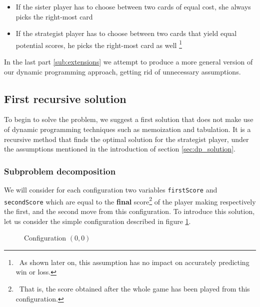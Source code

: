 \documentclass[a4paper,12pt,fleqn]{article}
\newcommand\ezskip{\medskip\noindent}
\begin{document}
\begin{itemize}
    \item If the sister player has to choose between two cards of equal cost, she always picks the right-most card
    \item If the strategist player has to choose between two cards that yield equal potential scores, he picks the right-most card as well \footnote{\ As shown later on, this assumption has no impact on accurately predicting win or loss.}
\end{itemize}

In the last part \ref{sub:extensions} we attempt to produce a more general version of our dynamic programming approach, getting rid of unnecessary assumptions.

\subsection{First recursive solution}

To begin to solve the problem, we suggest a first solution that does not make use of dynamic programming techniques such as memoization and tabulation. It is a recursive method that finds the optimal solution for the strategist player, under the assumptions mentioned in the introduction of section \ref{sec:dp_solution}.

\subsubsection{Subproblem decomposition} \label{sub:subproblems}
\ezskip
We will consider for each configuration two variables \texttt{firstScore} and \texttt{secondScore} which are equal to the \textbf{final} score\footnote{\ That is, the score obtained after the whole game has been played from this configuration.} of the player making respectively the first, and the second move from this configuration.
To introduce this solution, let us consider the simple configuration described in figure \ref{fig:recursive_01}.

\begin{figure}[H]
    \centering
    \caption{Configuration $(0,0)$}
    \label{fig:recursive_01}
\end{figure}
\end{document}
